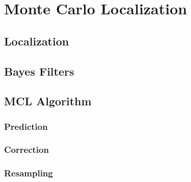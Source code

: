 \chapter{Monte Carlo Localization}
\label{chap:mcl}

\section{Localization}

\section{Bayes Filters}

\section{MCL Algorithm}

\subsection{Prediction}
\subsection{Correction}
\subsection{Resampling}
